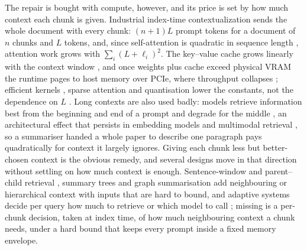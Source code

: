 \documentclass[pdflatex,sn-mathphys-num]{sn-jnl}
\theoremstyle{thmstyleone}%
\theoremstyle{thmstylethree}%
\begin{document}
The repair is bought with compute, however, and its price is set by how much context each chunk is given. Industrial index-time contextualization sends the whole document with every chunk: $(n+1)L$ prompt tokens for a document of $n$ chunks and $L$ tokens, and, since self-attention is quadratic in sequence length \cite{vaswani2017attention,tay2022efficient,kaplan2020scaling}, attention work grows with $\sum_i (L+\ell_i)^2$. The key--value cache grows linearly with the context window \cite{pope2023efficiently,kwon2023vllm,ainslie2023gqa}, and once weights plus cache exceed physical VRAM the runtime pages to host memory over PCIe, where throughput collapses \cite{sheng2023flexgen}; efficient kernels \cite{dao2022flashattention}, sparse attention \cite{beltagy2020longformer} and quantisation \cite{jacob2018quantization} lower the constants, not the dependence on $L$ \cite{shen2024RAGDesignTradeoffs,zhao2025RAGDesignDecisions,samsi2023words}. Long contexts are also used badly: models retrieve information best from the beginning and end of a prompt and degrade for the middle \cite{liu2023lostmiddlelanguagemodels}, an architectural effect \cite{guo2024serialpositioneffectslarge,menschikov2025earlytokenbiasmodelspecificlanguagespecific,hsieh2024found} that persists in embedding models \cite{lee2025quantifyingpositionalbiasestext} and multimodal retrieval \cite{yao2025spotlighthiddenbiasundermining}, so a summariser handed a whole paper to describe one paragraph pays quadratically for context it largely ignores. Giving each chunk less but better-chosen context is the obvious remedy, and several designs move in that direction without settling on how much context is enough. Sentence-window and parent--child retrieval \cite{gao2024retrievalaugmentedgenerationlargelanguage, Liu_LlamaIndex_2022}, summary trees \cite{sarthi2024raptorrecursiveabstractiveprocessing} and graph summarisation \cite{edge2024graphrag} add neighbouring or hierarchical context with inputs that are hard to bound, and adaptive systems decide per query how much to retrieve \cite{jeong2024adaptiverag,asai2024selfrag} or which model to call \cite{ong2024routellm,chen2023frugalgpt}; missing is a per-chunk decision, taken at index time, of how much neighbouring context a chunk needs, under a hard bound that keeps every prompt inside a fixed memory envelope.
\end{document}
